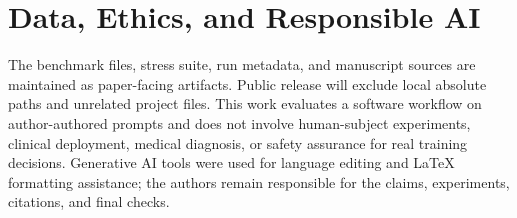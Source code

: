 \documentclass[runningheads,a4paper]{llncs}
\begin{document}
\section*{Data, Ethics, and Responsible AI}
The benchmark files, stress suite, run metadata, and manuscript sources are maintained as paper-facing artifacts. Public release will exclude local absolute paths and unrelated project files. This work evaluates a software workflow on author-authored prompts and does not involve human-subject experiments, clinical deployment, medical diagnosis, or safety assurance for real training decisions. Generative AI tools were used for language editing and LaTeX formatting assistance; the authors remain responsible for the claims, experiments, citations, and final checks.



\end{document}
